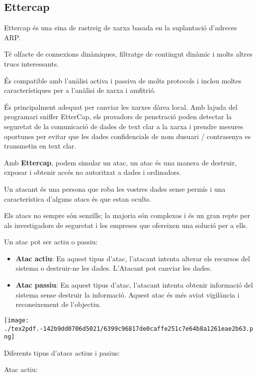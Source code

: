 \documentclass[]{article}
\begin{document}
\hypertarget{ettercap}{%
\subsection{\texorpdfstring{\textbf{Ettercap}}{Ettercap}}\label{ettercap}}

Ettercap és una eina de rastreig de xarxa basada en la suplantació
d'adreces ARP.

Té olfacte de connexions dinàmiques, filtratge de contingut dinàmic i
molts altres trucs interessants.

És compatible amb l'anàlisi activa i passiva de molts protocols i inclou
moltes característiques per a l'anàlisi de xarxa i amfitrió.

És principalment adequat per canviar les xarxes dàrea local. Amb lajuda
del programari sniffer EtterCap, els provadors de penetració poden
detectar la seguretat de la comunicació de dades de text clar a la xarxa
i prendre mesures oportunes per evitar que les dades confidencials de
nom dusuari / contrasenya es transmetin en text clar.

Amb \textbf{Ettercap}, podem simular un atac, un atac és una manera de
destruir, exposar i obtenir accés no autoritzat a dades i ordinadors.

Un atacant és una persona que roba les vostres dades sense permís i una
característica d'alguns atacs és que estan ocults.

Els atacs no sempre són senzills; la majoria són complexos i és un gran
repte per als investigadors de seguretat i les empreses que ofereixen
una solució per a ells.

Un atac pot ser actiu o passiu:

\begin{itemize}
\item
  \textbf{Atac actiu}: En aquest tipus d'atac, l'atacant intenta alterar
  els recursos del sistema o destruir-ne les dades. L'Atacant pot
  canviar les dades.
\item
  \textbf{Atac passiu}: En aquest tipus d'atac, l'atacant intenta
  obtenir informació del sistema sense destruir la informació. Aquest
  atac és més aviat vigilància i reconeixement de l'objectiu.
\end{itemize}

\texttt{[image: ./tex2pdf.-142b9dd0706d5021/6399c96817de0caffe251c7e64b8a1261eae2b63.png]}

Diferents tipus d'atacs actius i pasius:

Atac actiu:
\end{document}
